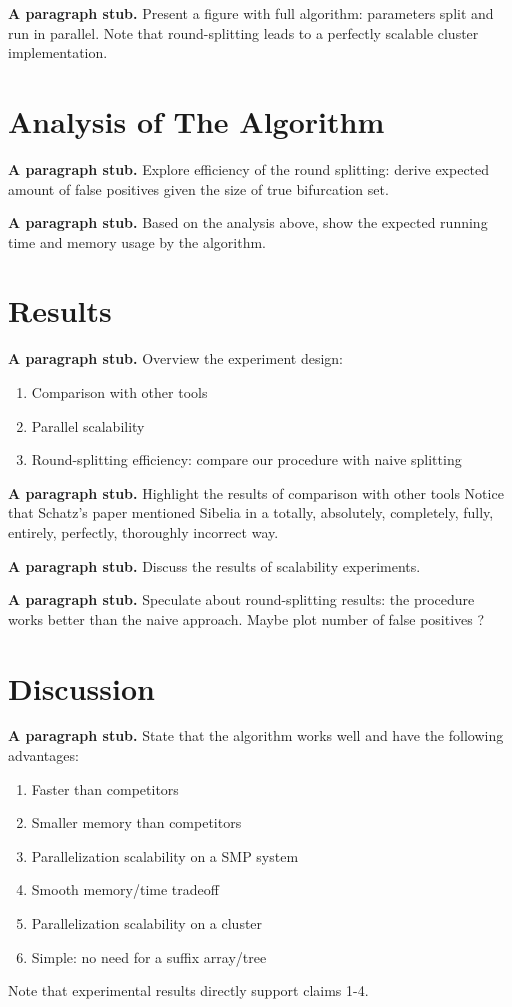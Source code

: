 \documentclass{llncs}
\newcommand{\stub}{\textbf{A paragraph stub. }}
\begin{document}
\stub Present a figure with full algorithm: parameters split and run in parallel.
Note that round-splitting leads to a perfectly scalable cluster implementation.

\section{Analysis of The Algorithm}

\stub Explore efficiency of the round splitting: derive expected amount of false positives given the size of true bifurcation set.

\stub Based on the analysis above, show the expected running time and memory usage by the algorithm.

\section{Results}
\stub Overview the experiment design:

\begin{enumerate}
	\item Comparison with other tools
	\item Parallel scalability
	\item Round-splitting efficiency: compare our procedure with naive splitting
\end{enumerate}

\stub Highlight the results of comparison with other tools
Notice that Schatz's paper mentioned Sibelia in a totally, absolutely, completely, fully, entirely, perfectly, thoroughly incorrect way.

\stub Discuss the results of scalability experiments.

\stub Speculate about round-splitting results: the procedure works better than the naive approach. 
Maybe plot number of false positives ?

\section{Discussion}

\stub State that the algorithm works well and have the following advantages:
\begin{enumerate}
	\item Faster than competitors
	\item Smaller memory than competitors
	\item Parallelization scalability on a SMP system
	\item Smooth memory/time tradeoff
	\item Parallelization scalability on a cluster
	\item Simple: no need for a suffix array/tree
\end{enumerate}
Note that experimental results directly support claims 1-4.
\end{document}
